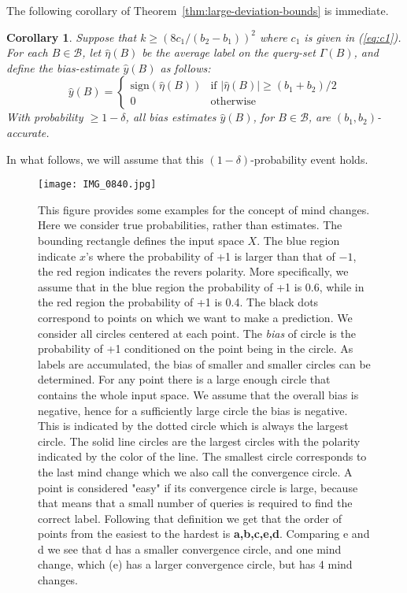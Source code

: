 \documentclass{article}
\def\B{{\mathcal B}}
\def\yh{{\widehat{y}}}
\newtheorem{cor}[thm]{Corollary}
\begin{document}
The following corollary of Theorem~\ref{thm:large-deviation-bounds} is immediate.
\begin{cor}
Suppose that $k \geq (8c_1/(b_2-b_1))^2$ where $c_1$ is given in (\ref{eq:c1}). 
For each $B \in \B$, let $\widehat{\eta}(B)$ be the average label on the query-set $\Gamma(B)$, and define the bias-estimate $\yh(B)$ as follows:
$$ \yh(B)
= 
\left\{
\begin{array}{ll}
\mbox{sign}(\widehat{\eta}(B)) & \mbox{if $|\widehat{\eta}(B)| \geq (b_1 + b_2)/2$} \\
0 & \mbox{otherwise}
\end{array}
\right.
$$
With probability $\geq 1-\delta$, all bias estimates $\yh(B)$, for $B \in \B$, are $(b_1,b_2)$-accurate.
\label{cor:accurate-bias-estimates}
\end{cor}
In what follows, we will assume that this $(1-\delta)$-probability event holds.



\pagebreak

\begin{figure}
\begin{center}
\texttt{[image: IMG\_0840.jpg]}
\end{center}

\caption{This figure provides some examples for the concept of mind changes. Here we consider true probabilities, rather than estimates. The bounding rectangle defines the input space $X$. The blue region indicate $x$'s where the probability of +1 is larger than that of $-1$, the red region indicates the revers polarity. More specifically, we assume that in the blue region the probability of +1 is 0.6, while in the red region the probability of +1 is 0.4.
The black dots correspond to points on which we want to make a prediction. We consider all circles centered at each point. The {\em bias} of  circle is the probability of +1 conditioned on the point being in the circle. As labels are accumulated, the bias of smaller and smaller circles can be determined. For any point there is a large enough circle that contains the whole input space. We assume that the overall bias is negative, hence for a sufficiently large circle the bias is negative. This is indicated by the dotted circle which is always the largest circle. The solid line circles are the largest circles with the polarity indicated by the color of the line. The smallest circle corresponds to the last mind change which we also call the convergence circle.
A point is considered "easy" if its convergence circle is large, because that means that a small number of queries is required to find the correct label.
Following that definition we get that the order of points from the easiest to the hardest is {\bf a,b,c,e,d}. Comparing e and d we see that d has a smaller convergence circle, and one mind change, which (e) has a larger convergence circle, but has 4 mind changes.
}

\label{fig:mind-changes}
\end{figure}
\end{document}
